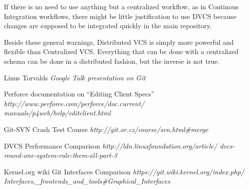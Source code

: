 \documentclass[a4paper,10pt]{article}
\begin{document}
If there is no need to use anything but a centralized workflow, as in Continous Integration 
workflows, there might be little justification to use DVCS because changes are supposed to be 
integrated quickly in the main repository.

Beside these general warnings, Distributed VCS is simply more powerful and flexible than Centralized VCS.
Everything that can be done with a centralized schema can be done in a distributed fashion, but the inverse
is not true. 


\begin{thebibliography}{9}

Linus Torvalds \emph{Google Talk presentation on Git}

Perforce documentation on ``Editing Client Specs''
\emph{
http://www.perforce.com/perforce/doc.current/
manuals/p4web/help/editclient.html
}

Git-SVN Crash Test Course
\emph{http://git.or.cz/course/svn.html\#merge}

DVCS Performance Comparison
\emph{http://ldn.linuxfoundation.org/article/
dvcs-round-one-system-rule-them-all-part-3}

Kernel.org wiki Git Interfaces Comparison
\emph{https://git.wiki.kernel.org/index.php/
Interfaces,\_frontends\_and\_tools\#Graphical\_Interfaces}

% 
% 
% 
% 
\end{thebibliography}
\end{document}
